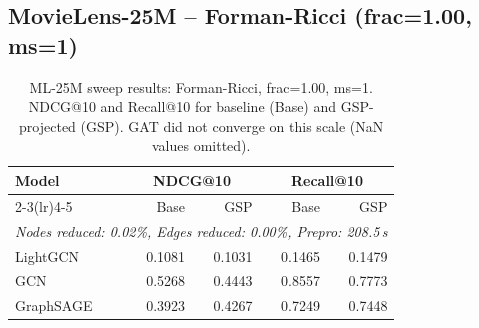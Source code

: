 \subsection*{MovieLens-25M -- Forman-Ricci (frac=1.00, ms=1)}
{\footnotesize
\setlength{\tabcolsep}{4pt}
\begin{table}[h]
\centering
\caption{ML-25M sweep results: Forman-Ricci, frac=1.00, ms=1. NDCG@10 and Recall@10 for baseline (Base) and GSP-projected (GSP). GAT did not converge on this scale (NaN values omitted).}
\label{tab:ml25m_sweep}
\begin{tabular}{l rrrr}
\toprule
\multirow{2}{*}{Model} & \multicolumn{2}{c}{NDCG@10} & \multicolumn{2}{c}{Recall@10} \\
\cmidrule(lr){2-3}\cmidrule(lr){4-5}
 & Base & GSP & Base & GSP \\
\midrule
\multicolumn{5}{l}{\textit{Nodes reduced: 0.02\%, Edges reduced: 0.00\%, Prepro: 208.5\,s}} \\
\midrule
LightGCN & 0.1081 & 0.1031 & 0.1465 & 0.1479 \\
GCN & 0.5268 & 0.4443 & 0.8557 & 0.7773 \\
GraphSAGE & 0.3923 & 0.4267 & 0.7249 & 0.7448 \\
\bottomrule
\end{tabular}
\end{table}
}
